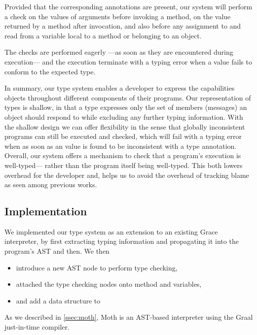 Provided that the corresponding annotations are present, 
our system will perform a check
on the values of arguments before invoking a method, 
on the value returned by a method after invocation, and
also before any assignment to and read from a variable local to
a method or belonging to an object. 

The checks are performed eagerly%
---as soon as they are encountered during execution---%
and the execution terminate with a typing error 
when a value fails to conform to the expected type.

In summary, our type system enables a developer to express
the capabilities objects throughout different components of 
their programs.
Our representation of types is shallow,
in that a type expresses only the set of members (messages) an object
should respond to while excluding any further typing information. 
With the shallow design we can offer flexibility in the sense that
globally inconsistent programs can still be executed and checked,
which will fail with a typing error when as soon as an value is found
to be inconsistent with a type annotation. 
Overall, our system offers a mechanism to check that a program's execution
is well-typed---%
rather than the program itself being well-typed.
This both lowers overhead for the developer and, 
helps us to avoid the overhead of tracking blame 
as seen among previous works.

\subsection{Implementation} 
\label{ssec:implementation} 





We implemented our type system as an extension to an existing Grace interpreter,
by first extracting typing information and propagating it into the program's AST
and then. We then 

\begin{itemize}
\item introduce a new AST node to perform type checking,
\item attached the type checking nodes onto method and variables,
\item and add a data structure to 
\end{itemize}
As we described in \cref{ssec:moth},
Moth is an AST-based interpreter
using the Graal just-in-time compiler\citep{Wurthinger:2017:PPE}.

